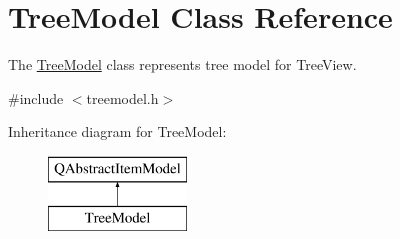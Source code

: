 \hypertarget{class_tree_model}{\section{Tree\-Model Class Reference}
\label{class_tree_model}
}


The \hyperlink{class_tree_model}{Tree\-Model} class represents tree model for Tree\-View.  




{\ttfamily \#include $<$treemodel.\-h$>$}

Inheritance diagram for Tree\-Model\-:\begin{figure}[H]
\begin{center}
\leavevmode
\includegraphics[height=2.000000cm]{class_tree_model}
\end{center}
\end{figure}
